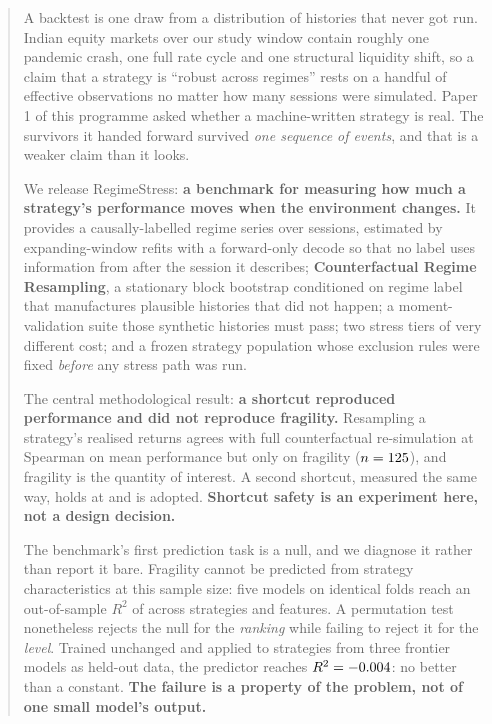\documentclass[11pt,a4paper]{article}
\begin{document}

\begin{abstract}
\noindent
A backtest is one draw from a distribution of histories that never got run. Indian equity markets
over our study window contain roughly one pandemic crash, one full rate cycle and one structural
liquidity shift, so a claim that a strategy is ``robust across regimes'' rests on a handful of
effective observations no matter how many sessions were simulated. Paper 1 of this programme asked
whether a machine-written strategy is real. The survivors it handed forward survived \emph{one
sequence of events}, and that is a weaker claim than it looks.

\medskip\noindent
We release RegimeStress: \textbf{a benchmark for measuring how much a strategy's performance moves
when the environment changes.} It provides a
causally-labelled regime series over \rsNLabelledSessions{} sessions, estimated by expanding-window
refits with a forward-only decode so that no label uses information from after the session it
describes; \textbf{Counterfactual Regime Resampling}, a stationary block bootstrap conditioned on
regime label that manufactures plausible histories that did not happen; a moment-validation suite
those synthetic histories must pass; two stress tiers of very different cost; and a frozen strategy
population whose exclusion rules were fixed \emph{before} any stress path was run.

\medskip\noindent
The central methodological result: \textbf{a shortcut reproduced performance and did not reproduce
fragility.} Resampling a strategy's realised returns agrees with full counterfactual re-simulation
at Spearman \rsTierAgreementMeanSharpe{} on mean performance but only
\rsTierAgreementFragility{} on fragility (\mbox{$n=\rsTierAgreementN{}$}), and fragility is the
quantity of interest. A second shortcut, measured the same way, holds at \rsShortcutSpearman{} and
is adopted. \textbf{Shortcut safety is an experiment here, not a design decision.}

\medskip\noindent
The benchmark's first prediction task is a null, and we diagnose it rather than report it bare.
Fragility cannot be predicted from strategy characteristics at this sample size: five models
on identical folds reach an out-of-sample $R^2$ of \rsPathsRawBestRsquared{} across
\rsPredictorRows{} strategies and \rsPredictorFeatures{} features. A permutation test nonetheless
rejects the null for the \emph{ranking} while failing to reject it for the \emph{level}. Trained
unchanged and applied to \rsGvPredPooledN{} strategies from three frontier models as held-out data,
the predictor reaches $R^2 = \rsGvPredPooledRsq{}$: no better than a constant. \textbf{The failure
is a property of the problem, not of one small model's output.}


\end{abstract}
\end{document}
